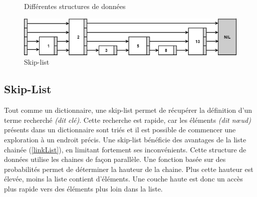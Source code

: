\documentclass[hidelinks,a4paper, 12pt]{article}
\begin{document}
	\begin{figure}[h]
		\centering
		\caption{Différentes structures de données}
	\end{figure}
	\begin{figure}
		\includegraphics[width=\textwidth]{img/skip}
		\caption{Skip-list}
		\label{skip}
	\end{figure}
	
	\newpage
	\subsection{Skip-List}
	Tout comme un dictionnaire, une skip-list permet de récupérer la définition d'un terme recherché \textit{(dit clé)}. Cette recherche est rapide, car les éléments \textit{(dit nœud)} présents dans un dictionnaire sont triés et il est possible de commencer une exploration à un endroit précis.
	Une skip-list bénéficie des avantages de la liste chainée (\cref{linkList}), en limitant fortement ses inconvénients. Cette structure de données utilise les chaines de façon parallèle. Une fonction basée sur des probabilités permet de déterminer la hauteur de la chaine. Plus cette hauteur est élevée, moins la liste contient d'éléments. Une couche haute est donc un accès plus rapide vers des éléments plus loin dans la liste.
	
\end{document}
